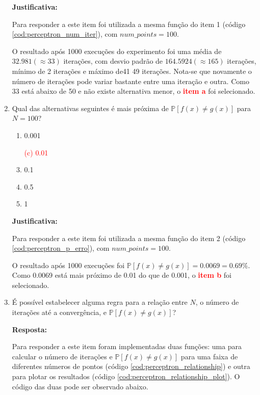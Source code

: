 \begin{enumerate}
    \par

    \textbf{Justificativa:}

    Para responder a este item foi utilizada a mesma função do item 1 (código \ref{cod:perceptron_num_iter}), com $num\_points = 100$. 
    
    O resultado após 1000 execuções do experimento foi uma média de $32.981 (\approx 33)$ iterações, com desvio padrão de $164.5924 (\approx 165)$ iterações, mínimo de 2 iterações e máximo de41 49 iterações. Nota-se que novamente o número de iterações pode variar bastante entre uma iteração e outra. Como 33 está abaixo de 50 e não existe alternativa menor, o \textcolor{red}{\textbf{item a}} foi selecionado. 
     

    \item Qual das alternativas seguintes é mais próxima de $\mathbb{P}[f(x) \neq g(x)]$ para $N = 100$?
    
    \begin{enumerate}
        \item 0.001
        \item[\textcolor{red}{(c)}]\textcolor{red}{0.01}\addtocounter{enumii}{1}
        \item 0.1
        \item 0.5
        \item 1
    \end{enumerate}

    \par

    \textbf{Justificativa:}

    Para responder a este item foi utilizada a mesma função do item 2 (código \ref{cod:perceptron_p_erro}), com $num\_points = 100$.

    O resultado após 1000 execuções foi  $\mathbb{P}[f(x) \neq g(x)] = 0.0069 = 0.69\%$. Como 0.0069 está mais próximo de 0.01 do que de 0.001, o \textcolor{red}{\textbf{item b}} foi selecionado. 
     
    
    \item  É possível estabelecer alguma regra para a relação entre $N$, o número de iterações até a convergência,
    e $\mathbb{P}[f(x) \neq g(x)]$?

    \par

    \textbf{Resposta:}

    Para responder a este item foram implementadas duas funções: uma para calcular o número de iterações e $\mathbb{P}[f(x) \neq g(x)]$ para uma faixa de diferentes números de pontos (código \ref{cod:perceptron_relationship}) e outra para plotar os resultados (código \ref{cod:perceptron_relationship_plot}). O código das duas pode ser observado abaixo.



\end{enumerate}
